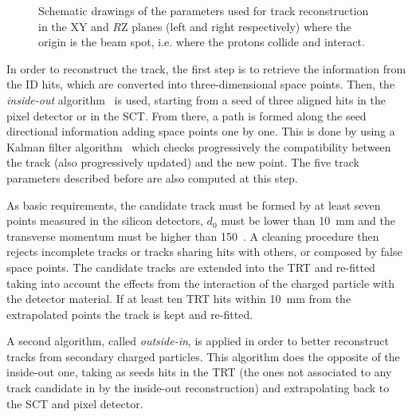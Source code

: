 \begin{figure}[tb]\begin{center}
	\caption[bla]{Schematic drawings of the parameters used for track reconstruction in the XY and $R$Z planes (left and right respectively)
          where the origin is the beam spot, i.e. where the protons collide and interact.
\label{fig:trackpar}}
\end{center}\end{figure}

In order to reconstruct the track, the first step is to retrieve the information from
the ID hits, which are converted into three-dimensional space points. Then, 
the {\it inside-out} algorithm~\cite{Cornelissen:1020106} is used, starting from a
seed of three aligned hits in the pixel detector or in the SCT.
From there, a path is formed along the seed directional information adding
space points one by one. This is done by using a Kalman filter algorithm~\cite{Frühwirth1987444}
which checks progressively the compatibility between the track (also progressively updated)
and the new point. The five track parameters described before are also computed at this step.

As basic requirements, the candidate track must be formed by at least seven points
measured in the silicon detectors, $d_0$ must be lower than 10~mm and the 
transverse momentum must be higher than 150~\mev.  A cleaning procedure then 
rejects incomplete tracks or tracks sharing hits with others, or composed by
false space points. The candidate tracks are extended
into the TRT and re-fitted taking into account the effects from the interaction
of the charged particle with the detector material. If at least ten TRT hits
within 10~mm from the extrapolated points the track is kept and re-fitted.

A second algorithm, called {\it outside-in}, is applied in order to better
reconstruct tracks from secondary charged particles. This algorithm does
the opposite of the inside-out one, taking as seeds hits in the TRT (the
ones not associated to any track candidate in by the inside-out reconstruction)
and extrapolating back to the SCT and pixel detector.


